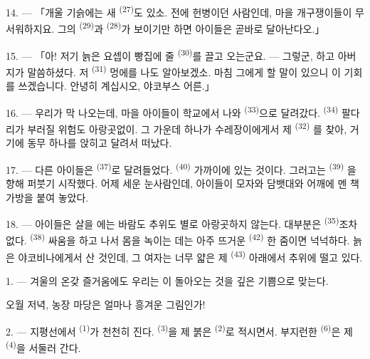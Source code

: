 14. --- 「개울 기슭에는 새  \textsuperscript{(27)}도 있소. 전에 헌병이던
사람인데, 마을 개구쟁이들이 무서워하지요. 그의  \textsuperscript{(29)}과
 \textsuperscript{(28)}가 보이기만 하면 아이들은 곧바로 달아난다오.」

15. --- 「아! 저기 늙은 요셉이 빵집에 줄 
\textsuperscript{(30)}를 끌고 오는군요. --- 그렇군, 하고 아버지가 말씀하셨다. 저
 \textsuperscript{(31)} 멍에를 나도 알아보겠소. 마침 그에게 할 말이 있으니
이 기회를 쓰겠습니다. 안녕히 계십시오, 야코부스 어른.」

16. --- 우리가 막 나오는데, 마을 아이들이 학교에서 나와 
\textsuperscript{(33)}으로 달려갔다.  \textsuperscript{(34)} 팔다리가 부러질
위험도 아랑곳없이. 그 가운데 하나가 수레장이에게서 제  \textsuperscript{(32)}
를 찾아, 거기에 동무 하나를 앉히고 달려서 떠났다.

17. --- 다른 아이들은  \textsuperscript{(37)}로 달려들었다. 
\textsuperscript{(40)} 가까이에 있는 것이다. 그러고는  \textsuperscript{(39)}
을 향해 퍼붓기 시작했다. 어제 세운 눈사람인데, 아이들이 모자와 담뱃대와 어깨에 멘 책가방을
붙여 놓았다.

18. --- 아이들은 살을 에는 바람도 추위도 별로 아랑곳하지 않는다. 대부분은 
\textsuperscript{(35)}조차 없다.  \textsuperscript{(38)} 싸움을 하고 나서
몸을 녹이는 데는 아주 뜨거운  \textsuperscript{(42)} 한 줌이면 넉넉하다.
늙은  야코비나에게서 산 것인데, 그 여자는 너무 얇은 제
 \textsuperscript{(43)} 아래에서 추위에 떨고 있다.

\VUsaut{3.0mm}
\VUsaut{3.0mm}

\VUsaut{4.0mm}

1. --- 겨울의 온갖 즐거움에도 우리는 이 돌아오는 것을 깊은 기쁨으로 맞는다.

오월 저녁, 농장 마당은 얼마나 흥겨운 그림인가!

2. --- 지평선에서  \textsuperscript{(1)}가 천천히 진다. 
\textsuperscript{(3)}을 제 붉은  \textsuperscript{(2)}로 적시면서. 부지런한
 \textsuperscript{(6)}은 제  \textsuperscript{(4)}을 서둘러
간다.

